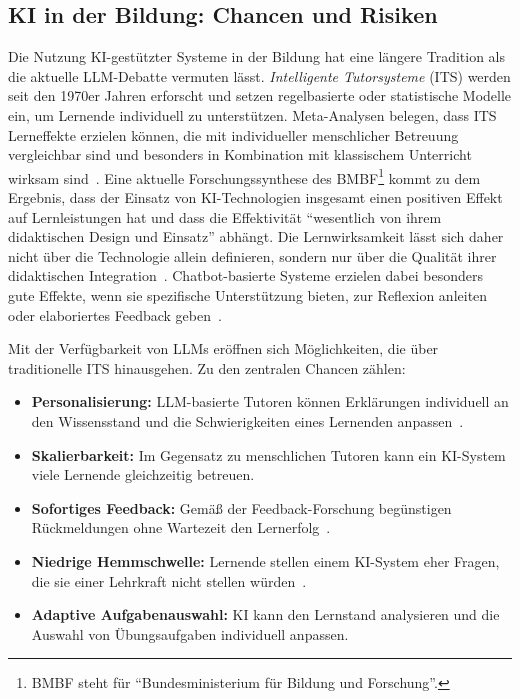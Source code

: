 \subsection{KI in der Bildung: Chancen und Risiken}\label{subsec:ki-chancen-risiken}

Die Nutzung KI-gestützter Systeme in der Bildung hat eine längere Tradition als die aktuelle LLM-Debatte vermuten lässt. \textit{Intelligente Tutorsysteme} (ITS) werden seit den 1970er Jahren erforscht und setzen regelbasierte oder statistische Modelle ein, um Lernende individuell zu unterstützen. Meta-Analysen belegen, dass ITS Lerneffekte erzielen können, die mit individueller menschlicher Betreuung vergleichbar sind und besonders in Kombination mit klassischem Unterricht wirksam sind~\cite{vanlehn2011, scheiter2025}. Eine aktuelle Forschungssynthese des BMBF\footnote{BMBF steht für \enquote{Bundesministerium für Bildung und Forschung}.} kommt zu dem Ergebnis, dass der Einsatz von KI-Technologien insgesamt einen positiven Effekt auf Lernleistungen hat und dass die Effektivität \enquote{wesentlich von ihrem didaktischen Design und Einsatz} abhängt. Die Lernwirksamkeit lässt sich daher nicht über die Technologie allein definieren, sondern nur über die Qualität ihrer didaktischen Integration~\cite{scheiter2025}. Chatbot-basierte Systeme erzielen dabei besonders gute Effekte, wenn sie spezifische Unterstützung bieten, zur Reflexion anleiten oder elaboriertes Feedback geben~\cite{scheiter2025}.

Mit der Verfügbarkeit von LLMs eröffnen sich Möglichkeiten, die über traditionelle ITS hinausgehen. Zu den zentralen Chancen zählen:

\begin{itemize}
    \item \textbf{Personalisierung:} LLM-basierte Tutoren können Erklärungen individuell an den Wissensstand und die Schwierigkeiten eines Lernenden anpassen~\cite{kasneci2023}.
    \item \textbf{Skalierbarkeit:} Im Gegensatz zu menschlichen Tutoren kann ein KI-System viele Lernende gleichzeitig betreuen.
    \item \textbf{Sofortiges Feedback:} Gemäß der Feedback-Forschung begünstigen Rückmeldungen ohne Wartezeit den Lernerfolg~\cite{hattie2007}.
    \item \textbf{Niedrige Hemmschwelle:} Lernende stellen einem KI-System eher Fragen, die sie einer Lehrkraft nicht stellen würden~\cite{kasneci2023}.
    \item \textbf{Adaptive Aufgabenauswahl:} KI kann den Lernstand analysieren und die Auswahl von Übungsaufgaben individuell anpassen.
\end{itemize}

